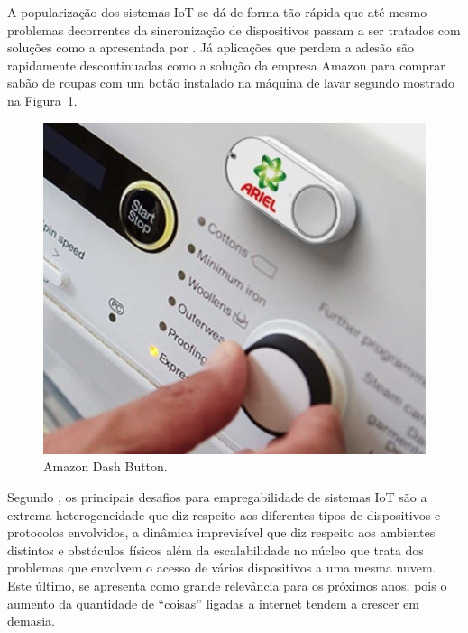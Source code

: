 A popularização dos sistemas IoT se dá de forma tão rápida que até mesmo problemas decorrentes da sincronização de dispositivos passam a ser tratados com soluções como a apresentada por . Já aplicações que perdem a adesão são rapidamente descontinuadas como a solução da empresa Amazon para comprar sabão de roupas com um botão instalado na máquina de lavar segundo  mostrado na Figura~\ref{fig:amazon}.

\begin{figure}[h!]
  \caption{Amazon Dash Button.}
  \begin{center}
      \includegraphics[scale=0.6]{img/Amazon-Dash-Button.png}
  \end{center}
  \label{fig:amazon}
\end{figure}

Segundo , os principais desafios para empregabilidade de sistemas IoT são a extrema heterogeneidade que diz respeito aos diferentes tipos de dispositivos e protocolos envolvidos, a dinâmica imprevisível que diz respeito aos ambientes distintos e obstáculos físicos além da escalabilidade no núcleo que trata dos problemas que envolvem o acesso de vários dispositivos a uma mesma nuvem. Este último, se apresenta como grande relevância para os próximos anos, pois o aumento da quantidade de ``coisas'' ligadas a internet tendem a crescer em demasia.


